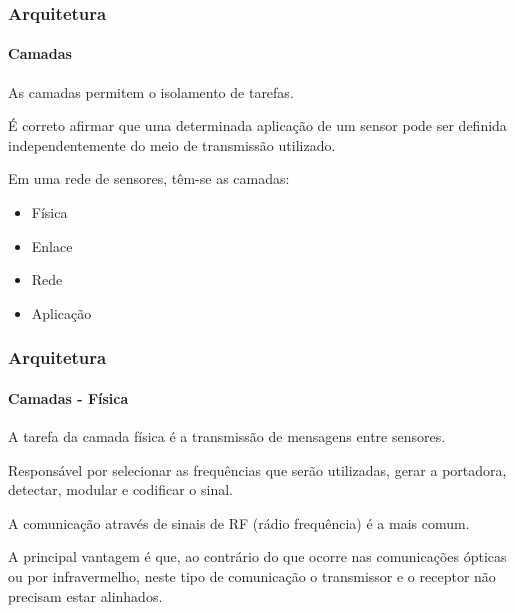 \documentclass[notes]{beamer}
\begin{document}
\begin{frame}
\frametitle{Arquitetura}
\framesubtitle{Camadas}

\begin{block}

As camadas permitem o isolamento de tarefas.

\end{block} \pause

\begin{block}

É correto afirmar que uma determinada aplicação de um sensor pode ser definida independentemente do meio de transmissão utilizado.

\end{block} \pause

\begin{block}

Em uma rede de sensores, têm-se as camadas: \pause

\begin{itemize}

\item Física \pause
\item Enlace \pause
\item Rede \pause
\item Aplicação

\end{itemize}

\end{block}

\end{frame}

\begin{frame}
\frametitle{Arquitetura}
\framesubtitle{Camadas - Física}

\begin{block}

A tarefa da camada física é a transmissão de mensagens entre sensores.

\end{block} \pause

\begin{block}

Responsável por selecionar as frequências que serão utilizadas, gerar a portadora, detectar, modular e codificar o sinal. 

\end{block} \pause

\begin{block}

A comunicação através de sinais de RF (rádio frequência) é a mais comum. 
\end{block} \pause

\begin{block}

A principal vantagem é que, ao contrário do que ocorre nas comunicações ópticas ou por infravermelho, neste tipo de comunicação o transmissor e o receptor não precisam estar alinhados.

\end{block}

\end{frame}
\end{document}
